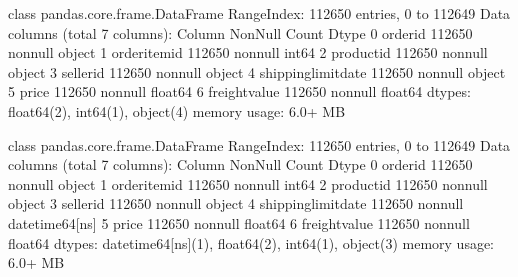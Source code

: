 \documentclass[letterpaper,10pt,english]{jupyterBook}
\begin{document}
\begin{sphinxVerbatim}[commandchars=\\\{\}]
\PYGZlt{}class \PYGZsq{}pandas.core.frame.DataFrame\PYGZsq{}\PYGZgt{}
RangeIndex: 112650 entries, 0 to 112649
Data columns (total 7 columns):
 \PYGZsh{}   Column               Non\PYGZhy{}Null Count   Dtype  
\PYGZhy{}\PYGZhy{}\PYGZhy{}  \PYGZhy{}\PYGZhy{}\PYGZhy{}\PYGZhy{}\PYGZhy{}\PYGZhy{}               \PYGZhy{}\PYGZhy{}\PYGZhy{}\PYGZhy{}\PYGZhy{}\PYGZhy{}\PYGZhy{}\PYGZhy{}\PYGZhy{}\PYGZhy{}\PYGZhy{}\PYGZhy{}\PYGZhy{}\PYGZhy{}   \PYGZhy{}\PYGZhy{}\PYGZhy{}\PYGZhy{}\PYGZhy{}  
 0   order\PYGZus{}id             112650 non\PYGZhy{}null  object 
 1   order\PYGZus{}item\PYGZus{}id        112650 non\PYGZhy{}null  int64  
 2   product\PYGZus{}id           112650 non\PYGZhy{}null  object 
 3   seller\PYGZus{}id            112650 non\PYGZhy{}null  object 
 4   shipping\PYGZus{}limit\PYGZus{}date  112650 non\PYGZhy{}null  object 
 5   price                112650 non\PYGZhy{}null  float64
 6   freight\PYGZus{}value        112650 non\PYGZhy{}null  float64
dtypes: float64(2), int64(1), object(4)
memory usage: 6.0+ MB
\end{sphinxVerbatim}

\begin{sphinxVerbatim}[commandchars=\\\{\}]
\PYG{p}{[}\PYG{p}{]} \PYG{p}{[}\PYG{p}{]}
\end{sphinxVerbatim}

\begin{sphinxVerbatim}[commandchars=\\\{\}]
\PYGZlt{}class \PYGZsq{}pandas.core.frame.DataFrame\PYGZsq{}\PYGZgt{}
RangeIndex: 112650 entries, 0 to 112649
Data columns (total 7 columns):
 \PYGZsh{}   Column               Non\PYGZhy{}Null Count   Dtype         
\PYGZhy{}\PYGZhy{}\PYGZhy{}  \PYGZhy{}\PYGZhy{}\PYGZhy{}\PYGZhy{}\PYGZhy{}\PYGZhy{}               \PYGZhy{}\PYGZhy{}\PYGZhy{}\PYGZhy{}\PYGZhy{}\PYGZhy{}\PYGZhy{}\PYGZhy{}\PYGZhy{}\PYGZhy{}\PYGZhy{}\PYGZhy{}\PYGZhy{}\PYGZhy{}   \PYGZhy{}\PYGZhy{}\PYGZhy{}\PYGZhy{}\PYGZhy{}         
 0   order\PYGZus{}id             112650 non\PYGZhy{}null  object        
 1   order\PYGZus{}item\PYGZus{}id        112650 non\PYGZhy{}null  int64         
 2   product\PYGZus{}id           112650 non\PYGZhy{}null  object        
 3   seller\PYGZus{}id            112650 non\PYGZhy{}null  object        
 4   shipping\PYGZus{}limit\PYGZus{}date  112650 non\PYGZhy{}null  datetime64[ns]
 5   price                112650 non\PYGZhy{}null  float64       
 6   freight\PYGZus{}value        112650 non\PYGZhy{}null  float64       
dtypes: datetime64[ns](1), float64(2), int64(1), object(3)
memory usage: 6.0+ MB
\end{sphinxVerbatim}
\end{document}
